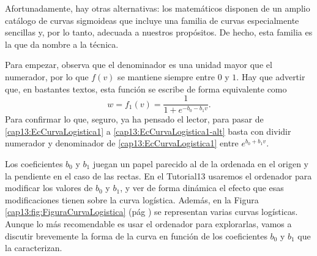 Afortunadamente, hay otras alternativas: los matemáticos disponen de un amplio catálogo de curvas sigmoideas que incluye una familia de curvas especialmente sencillas y, por lo tanto, adecuada a nuestros propósitos. De hecho, esta familia es la que da nombre a la técnica.


\begin{center}
    \end{center}

Para empezar, observa que el denominador es una unidad mayor que el numerador, por lo que
$f(v)$ se mantiene siempre entre $0$ y $1$. Hay que advertir que, en bastantes textos, esta
funci\'on se escribe de forma equivalente como
  \begin{equation}\label{cap13:EcCurvaLogistica1-alt}
	w=f_1(v)=\dfrac{1}{1+e^{-b_0-b_1 v}}.
  \end{equation}
Para confirmar lo que, seguro, ya ha pensado el lector, para pasar de
\eqref{cap13:EcCurvaLogistica1} a \eqref{cap13:EcCurvaLogistica1-alt} basta con dividir numerador y denominador de \eqref{cap13:EcCurvaLogistica1} entre
$e^ {b_0+b_1 v}$.

Los coeficientes  $b_0$ y $b_1$ juegan un papel parecido al de la ordenada en el origen y la pendiente en el caso de las rectas. En el Tutorial13 usaremos el ordenador para modificar los valores de $b_0$ y $b_1$, y ver de forma dinámica el efecto que esas modificaciones tienen sobre la curva logística. Además, en la Figura \ref{cap13:fig:FiguraCurvaLogistica} (pág \pageref{cap13:fig:FiguraCurvaLogistica})  se representan varias curvas logísticas. Aunque lo más recomendable es usar el ordenador para explorarlas, vamos a discutir brevemente la forma de la curva en función de los coeficientes $b_0$ y $b_1$ que la caracterizan.

